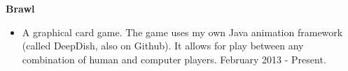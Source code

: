 \documentclass{res}
\begin{document}
\begin{resume}
\begin{itemize}
       \end{itemize} 

   {\bf Brawl} 
        \begin{itemize}
        \item[] A graphical card game. The game uses my own Java animation framework (called DeepDish, also on Github). It allows for play between any combination of human and computer players. February 2013 - Present.
        \end{itemize}
 
\end{resume}
\end{document}
